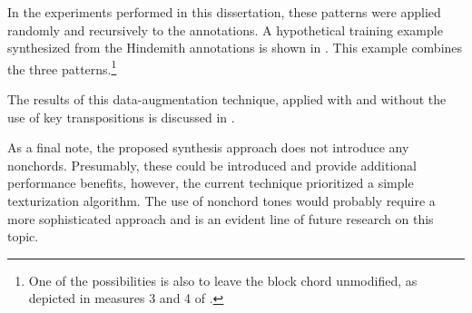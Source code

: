 
In the experiments performed in this dissertation, these
patterns were applied randomly and recursively to the
annotations. A hypothetical training example synthesized
from the Hindemith annotations is shown in
. This example combines the
three patterns.\footnote{One of the possibilities is also to
leave the block chord unmodified, as depicted in measures 3
and 4 of .}


The results of this data-augmentation technique, applied
with and without the use of key transpositions is discussed
in .

As a final note, the proposed synthesis approach does not
introduce any \gls{nonchord}s. Presumably, these could be
introduced and provide additional performance benefits,
however, the current technique prioritized a simple
texturization algorithm. The use of nonchord tones would
probably require a more sophisticated approach and is an
evident line of future research on this topic.
